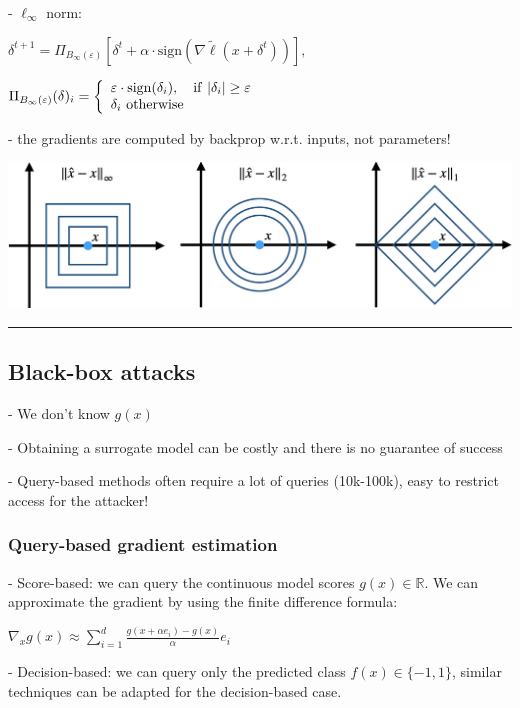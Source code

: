 - $\ell_\infty$ norm:

$\delta^{t+1}=\Pi_{B_{\infty}(\varepsilon)}\left[\delta^{t}+\alpha\cdot\mathrm{sign}(\nabla\tilde{\ell}(x+\delta^{t}))\right],$

$\Pi_{B_{\infty}(\varepsilon)}(\delta)_i=\left\{\begin{array}{l l}{\varepsilon\cdot\mathrm{sign}(\delta_{i}),\ \ \ \mathrm{if}\ |\delta_{i}|\geq\varepsilon}\\ {\delta_i \mathrm{~otherwise}}\end{array}\right.$

- the gradients are computed by backprop w.r.t. inputs, not parameters!

\includegraphics[width=\columnwidth]{figures/lp_norms.png}

\vspace{4pt}
\hrule
\vspace{4pt}
\subsection{Black-box attacks}

- We don't know $g(x)$

- Obtaining a surrogate model can be costly and there is no guarantee of success

- Query-based methods often require a lot of queries (10k-100k), easy to restrict access for the attacker!

\subsubsection{Query-based gradient estimation}

- Score-based: we can query the continuous model scores $g(x)\in \mathbb{R}$. We can approximate the gradient by using the finite difference formula:

$\nabla_{x}g(x)\approx\sum_{i=1}^{d}\frac{g(x+\alpha e_{i})-g(x)}{\alpha}e_{i}$

- Decision-based: we can query only the predicted class $f(x) \in \{-1,1\}$, similar techniques can be adapted for the decision-based case.

